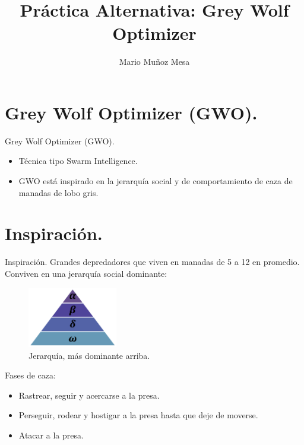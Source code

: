 \documentclass[a4paper,11pt]{beamer}
\author[ Mario Muñoz Mesa]{Mario Muñoz Mesa}
\title[Grey Wolf Optimizer]{Práctica Alternativa: Grey Wolf Optimizer}
\date{}
\begin{document}
\maketitle

\frame{
 \tableofcontents
}

\section{Grey Wolf Optimizer (GWO).}

\begin{frame}{Grey Wolf Optimizer (GWO).}
    \begin{itemize}
        \item Técnica tipo Swarm Intelligence.
        \item GWO está inspirado en la jerarquía social y de comportamiento de caza de manadas de lobo gris.
    \end{itemize}
\end{frame}

\section{Inspiración.}

\begin{frame}{Inspiración.}
    Grandes depredadores que viven en manadas de 5 a 12 en promedio. Conviven en una jerarquía social dominante:
    \begin{figure}[H]
		\centering
		\includegraphics[width=0.35\textwidth]{images/jerarq.png}
		\caption{Jerarquía, más dominante arriba.}
	\end{figure}
	Fases de caza:
	\begin{itemize}
		\item Rastrear, seguir y acercarse a la presa.
		\item Perseguir, rodear y hostigar a la presa hasta que deje de moverse.
		\item Atacar a la presa.
	\end{itemize}

    ~\\

\end{frame}
\end{document}
